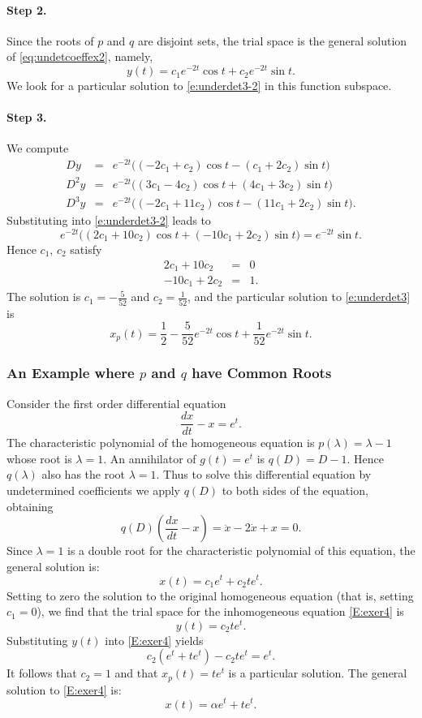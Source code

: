 \documentclass{ximera}
\begin{document}
\paragraph{Step 2.} Since the roots of $p$ and $q$ are disjoint sets, the 
trial space is the general solution of 
\eqref{eq:undetcoeffex2}, namely,  
\[
y(t) = c_1e^{-2t}\cos t + c_2 e^{-2t}\sin t.
\]
We look for a particular solution to \eqref{e:underdet3-2} in this function 
subspace.

\paragraph{Step 3.} We compute
\begin{eqnarray*}
Dy   & = & e^{-2t}\Big((-2c_1+  c_2)\cos t - (  c_1+2c_2)\sin t\Big)\\
D^2y & = & e^{-2t}\Big(( 3c_1- 4c_2)\cos t + ( 4c_1+3c_2)\sin t\Big)\\
D^3y & = & e^{-2t}\Big((-2c_1+11c_2)\cos t - (11c_1+2c_2)\sin t\Big).
\end{eqnarray*}
Substituting into \eqref{e:underdet3-2} leads to 
\[
e^{-2t}\Big( (2c_1+10c_2)\cos t +(-10c_1+2c_2)\sin t\Big) = 
e^{-2t}\sin t.
\]
Hence $c_1$, $c_2$ satisfy
\begin{eqnarray*}
  2c_1 +10c_2 & = & 0\\
-10c_1 + 2c_2 & = & 1.
\end{eqnarray*}
The solution is $c_1=-\frac{5}{52}$ and $c_2=\frac{1}{52}$, and
the particular solution to \eqref{e:underdet3} 
is
\[
x_p(t) = \frac{1}{2} - \frac{5}{52}e^{-2t}\cos t + \frac{1}{52}e^{-2t}\sin t.
\]


\subsubsection*{An Example where $p$ and $q$ have Common Roots}

Consider the first order differential equation
\begin{equation}  \label{E:exer4}
\frac{dx}{dt} - x = e^t.
\end{equation}
The characteristic polynomial of the homogeneous equation is 
$p(\lambda)=\lambda-1$ whose root is $\lambda=1$.  An 
annihilator of 
$g(t)=e^t$ is $q(D)=D-1$.  Hence $q(\lambda)$ also has the root $\lambda=1$.
Thus to solve this differential equation by 
undetermined coefficients we
apply $q(D)$ to both sides of the equation, obtaining
\[
q(D) \left(\frac{dx}{dt} - x\right) = \ddot{x} -2\dot{x} +x =0.
\]
Since $\lambda=1$ is a double root for the characteristic polynomial of this 
equation, the general solution is:
\[
x(t) = c_1e^t + c_2te^t.
\]
Setting to zero the solution to the original homogeneous equation (that is, 
setting $c_1=0$), we find that the trial space
for the inhomogeneous equation 
\eqref{E:exer4} is
\[
y(t) = c_2te^t.
\] 
Substituting $y(t)$ into \eqref{E:exer4} yields
\[
c_2(e^t + te^t) - c_2te^t = e^t.
\] 
It follows that $c_2=1$ and that $x_p(t) = te^t$ is a particular solution. 
The general solution to \eqref{E:exer4} is:
\[
x(t) = \alpha e^t + te^t.
\]
\end{document}
